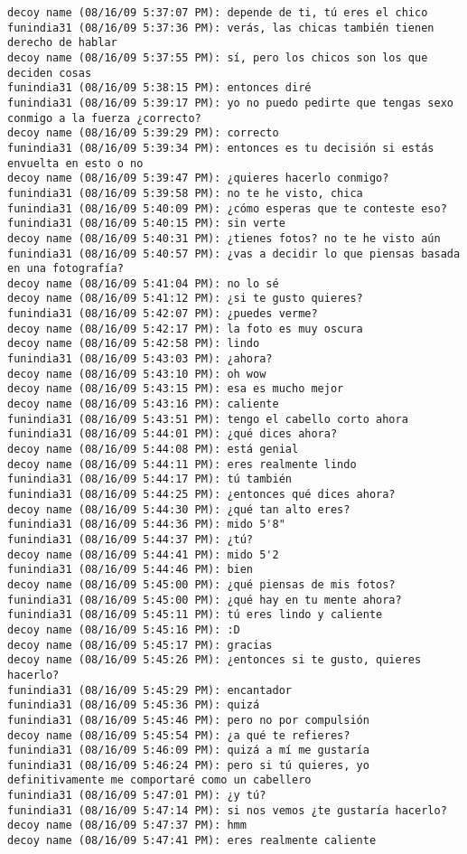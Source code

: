 \begin{verbatim}
decoy name (08/16/09 5:37:07 PM): depende de ti, tú eres el chico
funindia31 (08/16/09 5:37:36 PM): verás, las chicas también tienen derecho de hablar
decoy name (08/16/09 5:37:55 PM): sí, pero los chicos son los que deciden cosas
funindia31 (08/16/09 5:38:15 PM): entonces diré
funindia31 (08/16/09 5:39:17 PM): yo no puedo pedirte que tengas sexo conmigo a la fuerza ¿correcto?
decoy name (08/16/09 5:39:29 PM): correcto
funindia31 (08/16/09 5:39:34 PM): entonces es tu decisión si estás envuelta en esto o no
decoy name (08/16/09 5:39:47 PM): ¿quieres hacerlo conmigo?
funindia31 (08/16/09 5:39:58 PM): no te he visto, chica
funindia31 (08/16/09 5:40:09 PM): ¿cómo esperas que te conteste eso?
funindia31 (08/16/09 5:40:15 PM): sin verte
decoy name (08/16/09 5:40:31 PM): ¿tienes fotos? no te he visto aún
funindia31 (08/16/09 5:40:57 PM): ¿vas a decidir lo que piensas basada en una fotografía?
decoy name (08/16/09 5:41:04 PM): no lo sé
decoy name (08/16/09 5:41:12 PM): ¿si te gusto quieres?
funindia31 (08/16/09 5:42:07 PM): ¿puedes verme?
decoy name (08/16/09 5:42:17 PM): la foto es muy oscura
decoy name (08/16/09 5:42:58 PM): lindo
funindia31 (08/16/09 5:43:03 PM): ¿ahora?
decoy name (08/16/09 5:43:10 PM): oh wow
decoy name (08/16/09 5:43:15 PM): esa es mucho mejor
decoy name (08/16/09 5:43:16 PM): caliente
funindia31 (08/16/09 5:43:51 PM): tengo el cabello corto ahora
funindia31 (08/16/09 5:44:01 PM): ¿qué dices ahora?
decoy name (08/16/09 5:44:08 PM): está genial
decoy name (08/16/09 5:44:11 PM): eres realmente lindo
funindia31 (08/16/09 5:44:17 PM): tú también
funindia31 (08/16/09 5:44:25 PM): ¿entonces qué dices ahora?
decoy name (08/16/09 5:44:30 PM): ¿qué tan alto eres?
funindia31 (08/16/09 5:44:36 PM): mido 5'8"
funindia31 (08/16/09 5:44:37 PM): ¿tú?
decoy name (08/16/09 5:44:41 PM): mido 5'2
funindia31 (08/16/09 5:44:46 PM): bien
decoy name (08/16/09 5:45:00 PM): ¿qué piensas de mis fotos?
funindia31 (08/16/09 5:45:00 PM): ¿qué hay en tu mente ahora?
funindia31 (08/16/09 5:45:11 PM): tú eres lindo y caliente
decoy name (08/16/09 5:45:16 PM): :D
decoy name (08/16/09 5:45:17 PM): gracias
decoy name (08/16/09 5:45:26 PM): ¿entonces si te gusto, quieres hacerlo?
funindia31 (08/16/09 5:45:29 PM): encantador
funindia31 (08/16/09 5:45:36 PM): quizá
funindia31 (08/16/09 5:45:46 PM): pero no por compulsión 
decoy name (08/16/09 5:45:54 PM): ¿a qué te refieres?
funindia31 (08/16/09 5:46:09 PM): quizá a mí me gustaría
funindia31 (08/16/09 5:46:24 PM): pero si tú quieres, yo definitivamente me comportaré como un cabellero
funindia31 (08/16/09 5:47:01 PM): ¿y tú?
funindia31 (08/16/09 5:47:14 PM): si nos vemos ¿te gustaría hacerlo?
decoy name (08/16/09 5:47:37 PM): hmm
decoy name (08/16/09 5:47:41 PM): eres realmente caliente
\end{verbatim}







